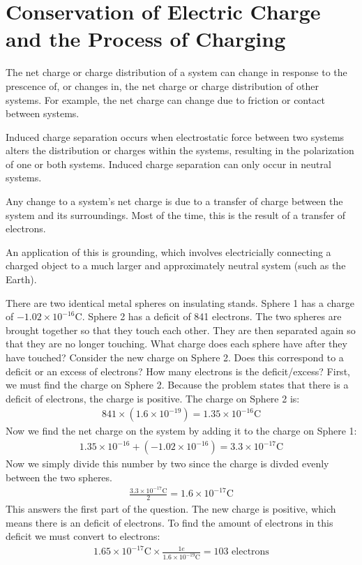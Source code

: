 \documentclass[../em.tex]{subfiles}
\begin{document}
\section{Conservation of Electric Charge and the Process of Charging}
The net charge or charge distribution of a system can change in response to the prescence of, or changes in, the net charge or charge distribution of other systems. For example, the net charge can change due to friction or contact between systems.

Induced charge separation occurs when electrostatic force between two systems alters the distribution or charges within the systems, resulting in the polarization of one or both systems. Induced charge separation can only occur in neutral systems.

Any change to a system's net charge is due to a transfer of charge between the system and its surroundings. Most of the time, this is the result of a transfer of electrons.

An application of this is grounding, which involves electricially connecting a charged object to a much larger and approximately neutral system (such as the Earth).
\begin{example}
    There are two identical metal spheres on insulating stands. Sphere 1 has a charge of $-1.02 \times 10^{-16}$C. Sphere 2 has a deficit of 841 electrons. The two spheres are brought together so that they touch each other. They are then separated again so that they are no longer touching. What charge does each sphere have after they have touched? Consider the new charge on Sphere 2. Does this correspond to a deficit or an excess of electrons? How many electrons is the deficit/excess?
    \smallbreak
    First, we must find the charge on Sphere 2. Because the problem states that there is a deficit of electrons, the charge is positive.
    The charge on Sphere 2 is:
    \begin{align*}
        841 \times (1.6\times 10^{-19}) = 1.35\times 10^{-16}\text{C}
    \end{align*}
    Now we find the net charge on the system by adding it to the charge on Sphere 1:
    \begin{align*}
        1.35 \times 10^{-16} + (-1.02 \times 10^{-16}) = 3.3\times 10^{-17}\text{C}
    \end{align*}
    Now we simply divide this number by two since the charge is divded evenly between the two spheres.
    \begin{align*}
        \frac{3.3\times 10^{-17}\text{C}}{2}=1.6\times 10^{-17}\text{C}    
    \end{align*}
    This answers the first part of the question.
    \smallbreak
    The new charge is positive, which means there is an deficit of electrons. To find the amount of electrons in this deficit we must convert to electrons:
    \begin{align*}
    1.65\times10^{-17}\text{C}\times \frac{1e}{1.6\times10^{-19}\text{C}}=103\text{ electrons}
    \end{align*} 

\end{example}
\end{document}
